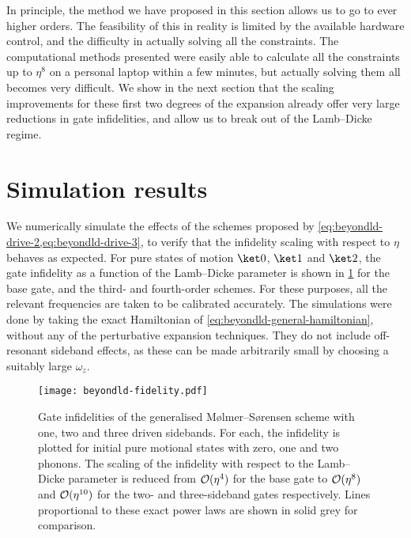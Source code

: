In principle, the method we have proposed in this section allows us to go to ever higher orders.
The feasibility of this in reality is limited by the available hardware control, and the difficulty in actually solving all the constraints.
The computational methods presented were easily able to calculate all the constraints up to $\eta^8$ on a personal laptop within a few minutes, but actually solving them all becomes very difficult.
We show in the next section that the scaling improvements for these first two degrees of the expansion already offer very large reductions in gate infidelities, and allow us to break out of the Lamb--Dicke regime.


\section{Simulation results}

We numerically simulate the effects of the schemes proposed by \cref{eq:beyondld-drive-2,eq:beyondld-drive-3}, to verify that the infidelity scaling with respect to $\eta$ behaves as expected.
For pure states of motion $\ket0$, $\ket1$ and $\ket2$, the gate infidelity as a function of the Lamb--Dicke parameter is shown in \cref{fig:beyondld-fidelity} for the base gate, and the third- and fourth-order schemes.
For these purposes, all the relevant frequencies are taken to be calibrated accurately.
The simulations were done by taking the exact Hamiltonian of \cref{eq:beyondld-general-hamiltonian}, without any of the perturbative expansion techniques.
They do not include off-resonant sideband effects, as these can be made arbitrarily small by choosing a suitably large $\omega_z$.

\begin{figure}%
    \texttt{[image: beyondld-fidelity.pdf]}%
    \caption[Gate infidelity of the strongly coupled M\o lmer--S\o rensen gate]{\label{fig:beyondld-fidelity}%
        Gate infidelities of the generalised M\o lmer--S\o rensen scheme with one, two and three driven sidebands.
        For each, the infidelity is plotted for initial pure motional states with zero, one and two phonons.
        The scaling of the infidelity with respect to the Lamb--Dicke parameter is reduced from $\operatorname{\mathcal{O}}(\eta^4)$ for the base gate to $\operatorname{\mathcal{O}}(\eta^8)$ and $\operatorname{\mathcal{O}}(\eta^{10})$ for the two- and three-sideband gates respectively.
        Lines proportional to these exact power laws are shown in solid grey for comparison.}%
\end{figure}

